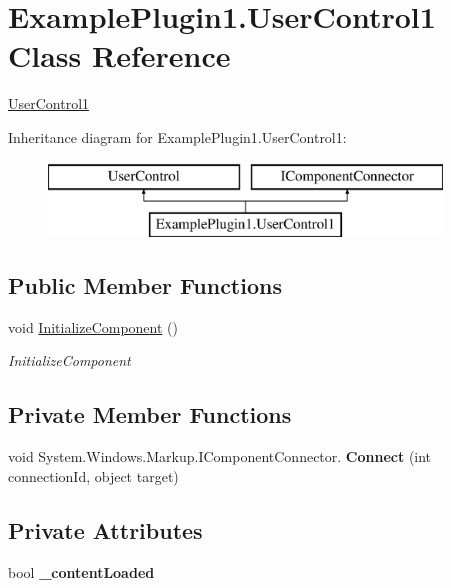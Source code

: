 \hypertarget{class_example_plugin1_1_1_user_control1}{}\section{Example\+Plugin1.\+User\+Control1 Class Reference}
\label{class_example_plugin1_1_1_user_control1}


\mbox{\hyperlink{class_example_plugin1_1_1_user_control1}{User\+Control1}}  


Inheritance diagram for Example\+Plugin1.\+User\+Control1\+:\begin{figure}[H]
\begin{center}
\leavevmode
\includegraphics[height=2.000000cm]{d3/d75/class_example_plugin1_1_1_user_control1}
\end{center}
\end{figure}
\subsection*{Public Member Functions}
\begin{DoxyCompactItemize}
\item 
void \mbox{\hyperlink{class_example_plugin1_1_1_user_control1_a6ac0d2c2a87f20540773c5e37c22274f}{Initialize\+Component}} ()
\begin{DoxyCompactList}\small\item\em Initialize\+Component \end{DoxyCompactList}\end{DoxyCompactItemize}
\subsection*{Private Member Functions}
\begin{DoxyCompactItemize}
\item 
\mbox{\label{class_example_plugin1_1_1_user_control1_abe1646181adf6d3d66b3e75bea968a52}} 
void System.\+Windows.\+Markup.\+I\+Component\+Connector. {\bfseries Connect} (int connection\+Id, object target)
\end{DoxyCompactItemize}
\subsection*{Private Attributes}
\begin{DoxyCompactItemize}
\item 
\mbox{\label{class_example_plugin1_1_1_user_control1_ad049e9f8d37c6fe6f71a5e9433d08681}} 
bool {\bfseries \+\_\+content\+Loaded}
\end{DoxyCompactItemize}


